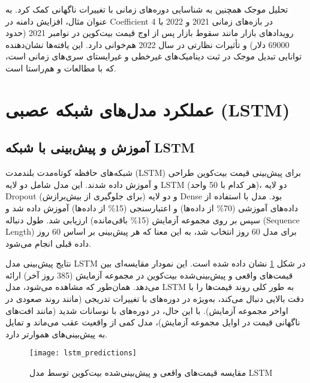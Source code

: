 تحلیل موجک همچنین به شناسایی دوره‌های زمانی با تغییرات ناگهانی کمک کرد. به عنوان مثال، افزایش دامنه در Coefficient 4 در بازه‌های زمانی 2021 و 2022 با رویدادهای بازار مانند سقوط بازار پس از اوج قیمت بیت‌کوین در نوامبر 2021 (حدود 69000 دلار) و تأثیرات نظارتی در سال 2022 هم‌خوانی دارد. این یافته‌ها نشان‌دهنده توانایی تبدیل موجک در ثبت دینامیک‌های غیرخطی و غیرایستای سری‌های زمانی است، که با مطالعات \cite{mallat1999wavelet} و \cite{percival2000wavelet} هم‌راستا است.

\section{عملکرد مدل‌های شبکه عصبی (LSTM)}
\label{sec:nn_results}

\subsection{آموزش و پیش‌بینی با شبکه LSTM}
شبکه‌های حافظه کوتاه‌مدت بلندمدت (LSTM) برای پیش‌بینی قیمت بیت‌کوین طراحی و آموزش داده شدند. این مدل شامل دو لایه LSTM (هر کدام با 50 واحد)، دو لایه Dropout (برای جلوگیری از بیش‌برازش) و دو لایه Dense بود. مدل با استفاده از داده‌های آموزشی (70\% از داده‌ها) و اعتبارسنجی (15\% از داده‌ها) آموزش داده شد و سپس بر روی مجموعه آزمایش (15\% باقی‌مانده) ارزیابی شد. طول دنباله (Sequence Length) برای مدل 60 روز انتخاب شد، به این معنا که هر پیش‌بینی بر اساس 60 روز داده قبلی انجام می‌شود.

نتایج پیش‌بینی مدل LSTM در شکل \ref{fig:lstm_predictions} نشان داده شده است. این نمودار مقایسه‌ای بین قیمت‌های واقعی و پیش‌بینی‌شده بیت‌کوین در مجموعه آزمایش (385 روز آخر) ارائه می‌دهد. همان‌طور که مشاهده می‌شود، مدل LSTM به طور کلی روند قیمت‌ها را با دقت بالایی دنبال می‌کند، به‌ویژه در دوره‌های با تغییرات تدریجی (مانند روند صعودی در اواخر مجموعه آزمایش). با این حال، در دوره‌های با نوسانات شدید (مانند افت‌های ناگهانی قیمت در اوایل مجموعه آزمایش)، مدل کمی از واقعیت عقب می‌ماند و تمایل به پیش‌بینی‌های هموارتر دارد.

\begin{figure}[H]
	\centering
	\texttt{[image: lstm\_predictions]}
	\caption{مقایسه قیمت‌های واقعی و پیش‌بینی‌شده بیت‌کوین توسط مدل LSTM}
	\label{fig:lstm_predictions}
\end{figure}

